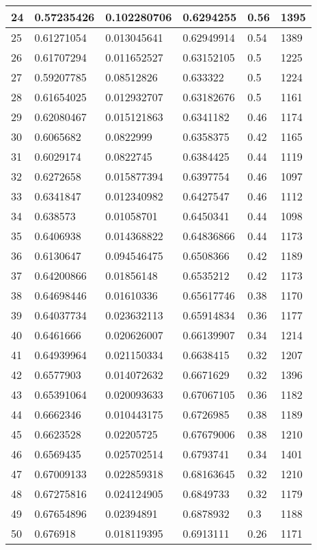 \begin{longtable}{|l|l|l|l|l|l|}
24 & 0.57235426 & 0.102280706 & 0.6294255 & 0.56 & 1395 \\ \hline 
25 & 0.61271054 & 0.013045641 & 0.62949914 & 0.54 & 1389 \\ \hline 
26 & 0.61707294 & 0.011652527 & 0.63152105 & 0.5 & 1225 \\ \hline 
27 & 0.59207785 & 0.08512826 & 0.633322 & 0.5 & 1224 \\ \hline 
28 & 0.61654025 & 0.012932707 & 0.63182676 & 0.5 & 1161 \\ \hline 
29 & 0.62080467 & 0.015121863 & 0.6341182 & 0.46 & 1174 \\ \hline 
30 & 0.6065682 & 0.0822999 & 0.6358375 & 0.42 & 1165 \\ \hline 
31 & 0.6029174 & 0.0822745 & 0.6384425 & 0.44 & 1119 \\ \hline 
32 & 0.6272658 & 0.015877394 & 0.6397754 & 0.46 & 1097 \\ \hline 
33 & 0.6341847 & 0.012340982 & 0.6427547 & 0.46 & 1112 \\ \hline 
34 & 0.638573 & 0.01058701 & 0.6450341 & 0.44 & 1098 \\ \hline 
35 & 0.6406938 & 0.014368822 & 0.64836866 & 0.44 & 1173 \\ \hline 
36 & 0.6130647 & 0.094546475 & 0.6508366 & 0.42 & 1189 \\ \hline 
37 & 0.64200866 & 0.01856148 & 0.6535212 & 0.42 & 1173 \\ \hline 
38 & 0.64698446 & 0.01610336 & 0.65617746 & 0.38 & 1170 \\ \hline 
39 & 0.64037734 & 0.023632113 & 0.65914834 & 0.36 & 1177 \\ \hline 
40 & 0.6461666 & 0.020626007 & 0.66139907 & 0.34 & 1214 \\ \hline 
41 & 0.64939964 & 0.021150334 & 0.6638415 & 0.32 & 1207 \\ \hline 
42 & 0.6577903 & 0.014072632 & 0.6671629 & 0.32 & 1396 \\ \hline 
43 & 0.65391064 & 0.020093633 & 0.67067105 & 0.36 & 1182 \\ \hline 
44 & 0.6662346 & 0.010443175 & 0.6726985 & 0.38 & 1189 \\ \hline 
45 & 0.6623528 & 0.02205725 & 0.67679006 & 0.38 & 1210 \\ \hline 
46 & 0.6569435 & 0.025702514 & 0.6793741 & 0.34 & 1401 \\ \hline 
47 & 0.67009133 & 0.022859318 & 0.68163645 & 0.32 & 1210 \\ \hline 
48 & 0.67275816 & 0.024124905 & 0.6849733 & 0.32 & 1179 \\ \hline 
49 & 0.67654896 & 0.02394891 & 0.6878932 & 0.3 & 1188 \\ \hline 
50 & 0.676918 & 0.018119395 & 0.6913111 & 0.26 & 1171 \\ \hline 
\end{longtable}